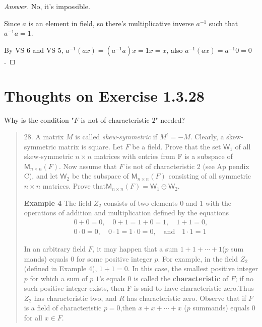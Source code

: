 \documentclass{article}
\newcommand{\0}{\mathit{0}}
\begin{document}
\begin{proof}[Answer]
    No, it's impossible.

    Since $a$ is an element in field,
    so there's multiplicative inverse $a^{-1}$ such that $a^{-1} a=1$.

    By VS 6 and VS 5, $a^{-1} (ax)=(a^{-1}a)x=1x=x$, also $a^{-1} (ax)=a^{-1}\0=0$.
\end{proof}

\section{Thoughts on Exercise 1.3.28}
Why is the condition "$F$ is not of characteristic $2$" needed?

\begin{quotation}
    28. A matrix $M$ is called \textit{skew-symmetric} if $M^t = -M$.
    Clearly, a skew-symmetric matrix is square. Let $F$ be a field. Prove that the set $\mathsf{W}_1$ of all skew-symmetric $n\times n$ matrices with entries from F is a subspace of $\mathsf{M}_{n\times n}(F)$. Now assume that $F$ is not of characteristic 2 (see Ap
    pendix C), and let $\mathsf{W}_2$ be the subspace of $\mathsf{M}_{n\times n}(F)$ consisting of all
    symmetric $n\times n$ matrices. Prove that$\mathsf{M}_{n\times n}(F)=\mathsf{W}_1 \oplus \mathsf{W}_2$.


    \textbf{Example 4}
    The field $Z_2$ consists of two elements $0$ and $1$ with the operations of addition
    and multiplication defined by the equations
    \begin{gather*}
        0+0=0,\quad 0+1=1+0=1,\quad1+1=0,\\
        0\cdot 0=0, \quad 0\cdot 1=1\cdot 0=0, \quad \text{and} \quad1\cdot 1=1
    \end{gather*}

    In an arbitrary field $F$, it may happen that a sum $1+1+\cdots +1$($p$ sum
    mands) equals $0$ for some positive integer $p$. For example, in the field $Z_2$
    (defined in Example 4), $1+1 = 0$. In this case, the smallest positive integer $p$
    for which a sum of $p$ $1$’s equals $0$ is called the \textbf{characteristic} of $F$; if no such
    positive integer exists, then F is said to have characteristic zero.Thus $Z_2$
    has characteristic two, and $R$ has characteristic zero. Observe that if $F$ is a
    field of characteristic $p=0$,then $x+x+\cdots +x$ ($p$ summands) equals $0$ for all
    $x \in F$.

\end{quotation}
\end{document}
